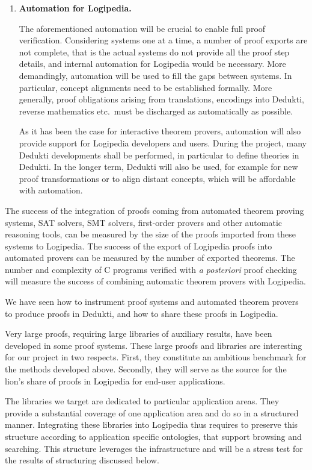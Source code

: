 \begin{enumerate}[\bf(a)]
\item{\bf Automation for Logipedia.}

  The aforementioned automation will be crucial to enable full proof
verification. Considering systems one at a time, a number of proof
exports are not complete, that is the actual systems do not provide
all the proof step details, and internal automation for Logipedia would be
necessary. More demandingly, automation will be used to fill the gaps
between systems. In particular, concept alignments need to be established
formally. More generally, proof obligations arising from translations,
encodings into Dedukti, reverse mathematics etc.\ must be discharged
as automatically as possible.

As it has been the case for interactive theorem provers, automation
will also provide support for Logipedia developers and users. During
the project, many Dedukti developments shall be performed, in
particular to define theories in Dedukti. In the longer term, Dedukti
will also be used, for example for new proof transformations or to
align distant concepts, which will be affordable with automation.
\end{enumerate}

The success of the integration of proofs coming from automated theorem
proving systems, SAT solvers, SMT solvers, first-order provers and other
automatic reasoning tools, can be
measured by the size of the proofs imported from these systems to Logipedia.
%
The success of the export of Logipedia proofs into automated provers can
be measured by the number of exported theorems.
%
The number and complexity of C programs verified with {\em a posteriori}
proof checking will measure the success of combining automatic theorem provers with Logipedia.


We have seen how to instrument proof systems and
automated theorem provers to produce proofs in Dedukti, and how to
share these proofs in Logipedia.

Very large proofs, requiring large libraries of auxiliary results,
have been developed in some proof systems. These large proofs and
libraries are interesting for our project in two respects. First, they
constitute an ambitious benchmark for the methods developed
above. Secondly, they will serve as the source for the lion's share of
proofs in Logipedia for end-user applications.

The libraries we target are dedicated to particular application
areas. They provide a substantial coverage of one application area and
do so in a structured manner. Integrating these libraries into
Logipedia thus requires to preserve this structure according to
application specific ontologies, that support browsing and
searching. This structure leverages the infrastructure and will be a
stress test for the results of structuring discussed below.

